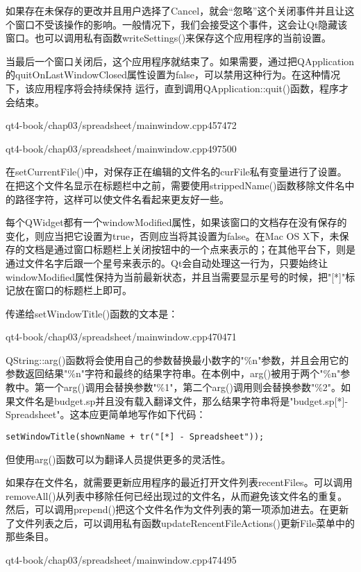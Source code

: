 \documentclass[11pt,oneside]{book}
\begin{document}
\begin{common-format}
如果存在未保存的更改并且用户选择了Cancel，就会“忽略”这个关闭事件并且让这个窗口不受该操作的影响。一般情况下，我们会接受这个事件，这会让Qt隐藏该窗口。也可以调用私有函数writeSettings()来保存这个应用程序的当前设置。

当最后一个窗口关闭后，这个应用程序就结束了。如果需要，通过把QApplication的quitOnLastWindowClosed属性设置为false，可以禁用这种行为。在这种情况下，该应用程序将会持续保持
运行，直到调用QApplication::quit()函数，程序才会结束。
\begin{cppline}{qt4-book/chap03/spreadsheet/mainwindow.cpp}{457}{472}
\end{cppline}
\begin{cppline}{qt4-book/chap03/spreadsheet/mainwindow.cpp}{497}{500}
\end{cppline}


在setCurrentFile()中，对保存正在编辑的文件名的curFile私有变量进行了设置。在把这个文件名显示在标题栏中之前，需要使用strippedName()函数移除文件名中的路径字符，这样可以使文件名看起来更友好一些。   

每个QWidget都有一个windowModified属性，如果该窗口的文档存在没有保存的变化，则应当把它设置为true，否则应当将其设置为false。在Mac OS X下，未保存的文档是通过窗口标题栏上关闭按钮中的一个点来表示的；在其他平台下，则是通过文件名字后跟一个星号来表示的。Qt会自动处理这一行为，只要始终让windowModified属性保持为当前最新状态，并且当需要显示星号的时候，把"[*]"标记放在窗口的标题栏上即可。

传递给setWindowTitle()函数的文本是：
\begin{cppline}{qt4-book/chap03/spreadsheet/mainwindow.cpp}{470}{471}
\end{cppline}


QString::arg()函数将会使用自己的参数替换最小数字的"\%{}n"参数，并且会用它的参数返回结果"\%{}n"字符和最终的结果字符串。在本例中，arg()被用于两个"\%{}n"参教中。第一个arg()调用会替换参数"\%{}1"，第二个arg()调用则会替换参数"\%{}2"。如果文件名是budget.sp并且没有载入翻译文件，那么结果字符串将是"budget.sp[*]-Spreadsheet"。这本应更简单地写作如下代码：
\begin{Verbatim}
setWindowTitle(shownName + tr("[*] - Spreadsheet"));
\end{Verbatim}

但使用arg()函数可以为翻译人员提供更多的灵活性。

如果存在文件名，就需要更新应用程序的最近打开文件列表recentFiles。可以调用removeAll()从列表中移除任何已经出现过的文件名，从而避免该文件名的重复。然后，可以调用prepend()把这个文件名作为文件列表的第一项添加进去。在更新了文件列表之后，可以调用私有函数updateRencentFileActions()更新File菜单中的那些条目。
\begin{cppline}{qt4-book/chap03/spreadsheet/mainwindow.cpp}{474}{495}
\end{cppline}


\end{common-format}
\end{document}
